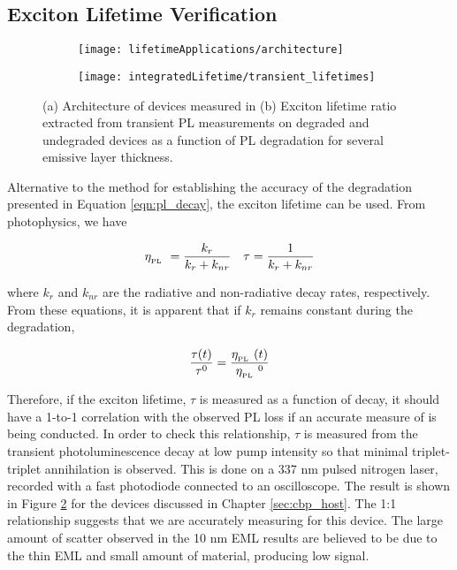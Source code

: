 \documentclass[../thesis.tex]{subfiles}
\begin{document}
\subsection{Exciton Lifetime Verification}\label{sec:lifetime_pl_transients}
\begin{figure}[ht]
\centering
    \begin{subfigure}{.45\textwidth}
\centering
    \texttt{[image: lifetimeApplications/architecture]}
    \caption{}
    \end{subfigure}
    \begin{subfigure}{.45\textwidth}
\centering
    \texttt{[image: integratedLifetime/transient\_lifetimes]}
    \caption{}
    \label{fig:transient_lifetimes}
    \end{subfigure}
\caption{(a) Architecture of devices measured in (b) Exciton lifetime ratio extracted from transient PL measurements on degraded and undegraded devices as a function of PL degradation for several emissive layer thickness.}
\end{figure}


Alternative to the method for establishing the accuracy of the \pl degradation presented in Equation \ref{eqn:pl_decay}, the exciton lifetime can be used.
From photophysics, we have

\begin{align}
\eta_{_\text{\tiny PL}}\ =\frac{k_r}{k_r+k_{nr}} && \tau=\frac{1}{k_r+k_{nr}}
\label{eqn:tau_pleff}
\end{align}

where $k_r$ and $k_{nr}$ are the radiative and non-radiative decay rates, respectively.
From these equations, it is apparent that if $k_r$ remains constant during the degradation, 

\begin{equation}
\frac{\tau(t)}{\tau^0}=\frac{\eta_{_\text{\tiny PL}}\ (t)}{\eta_{_\text{\tiny PL}}\ ^0}
\end{equation}


Therefore, if the exciton lifetime, $\tau$ is measured as a function of decay, it should have a 1-to-1 correlation with the observed PL loss if an accurate measure of \pl is being conducted.  
In order to check this relationship, $\tau$ is measured from the transient photoluminescence decay at low pump intensity so that minimal triplet-triplet annihilation is observed. 
This is done on a 337 nm pulsed nitrogen laser, recorded with a fast photodiode connected to an oscilloscope.
The result is shown in Figure \ref{fig:transient_lifetimes} for the devices discussed in Chapter \ref{sec:cbp_host}.
The 1:1 relationship suggests that we are accurately measuring \pl for this device.  
The large amount of scatter observed in the 10 nm EML results are believed to be due to the thin EML and small amount of material, producing low signal.
\end{document}
